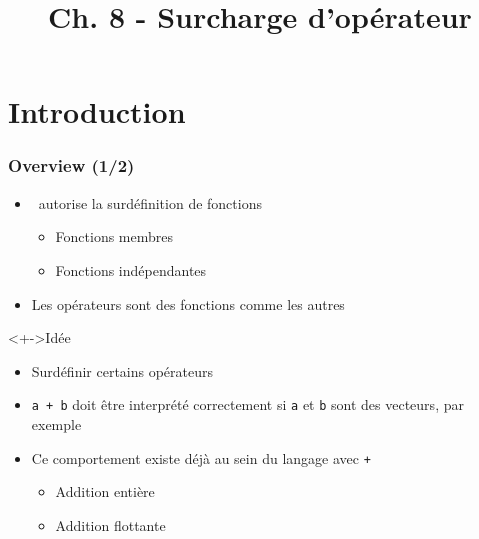 


\title{Ch. 8 - Surcharge d'opérateur}




\section{Introduction}

\begin{frame}
\frametitle{Overview (1/2)}
\begin{itemize}[<+->]
\item \cpp\ autorise la surdéfinition de fonctions
	\begin{itemize}
	\item Fonctions membres
	\item Fonctions indépendantes
	\end{itemize}
\item Les opérateurs sont des fonctions comme les autres
\end{itemize}
\begin{exampleblock}<+->{Idée}
	\begin{itemize}[<+->]
	\item Surdéfinir certains opérateurs
	\item \texttt{a + b} doit être interprété correctement si \texttt{a} et \texttt{b} sont des vecteurs, par exemple
	\end{itemize}
\end{exampleblock}
\begin{itemize}[<+->]
\item Ce comportement existe déjà au sein du langage avec \texttt{+}
	\begin{itemize}
	\item Addition entière
	\item Addition flottante
	\end{itemize}
\end{itemize}
\end{frame}

